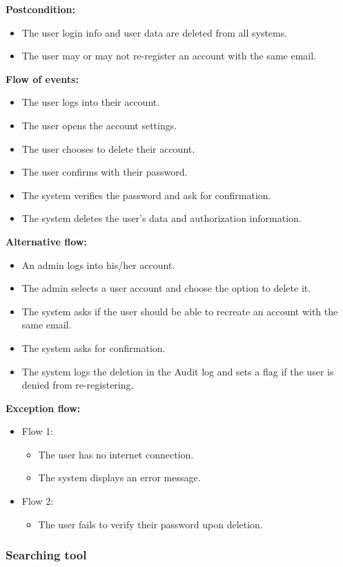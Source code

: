 \documentclass[a4paper]{article}
\begin{document}
        \textbf{Postcondition:}
        \begin{itemize}
            \item The user login info and user data are deleted from all systems.
            \item The user may or may not re-register an account with the same email.
        \end{itemize}

        \textbf{Flow of events:}
        \begin{itemize}
            \item The user logs into their account.
            \item The user opens the account settings.
            \item The user chooses to delete their account.
            \item The user confirms with their password.
            \item The system verifies the password and ask for confirmation.
            \item The system deletes the user's data and authorization information.
        \end{itemize}

        \textbf{Alternative flow:}
        \begin{itemize}
            \item An admin logs into his/her account.
            \item The admin selects a user account and choose the option to delete it.
            \item The system asks if the user should be able to recreate an account with the same email.
            \item The system asks for confirmation.
            \item The system logs the deletion in the Audit log and sets a flag if the user is denied from re-registering.
        \end{itemize}

        \textbf{Exception flow:}
        \begin{itemize}
            \item Flow 1:
            \begin{itemize}
                \item The user has no internet connection.
                \item The system displays an error message.
            \end{itemize}
            \item Flow 2:
            \begin{itemize}
                \item The user fails to verify their password upon deletion.
            \end{itemize}
        \end{itemize}

        \subsubsection{Searching tool}
\section{}
\end{document}
